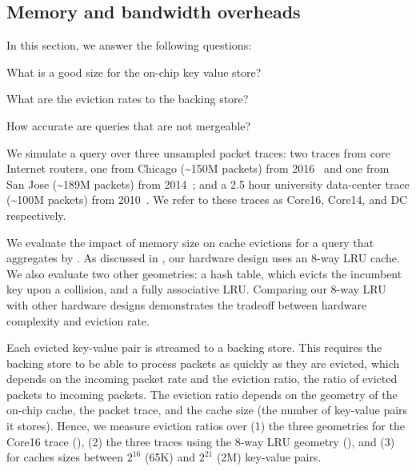 \subsection{Memory and bandwidth overheads}
\label{s:eval:traces}
\label{sec:eval:traces}

In this section, we answer the following questions:
\begin{CompactEnumerate}
\item What is a good size for the on-chip key value store?
\item What are the eviction rates to the backing store?
\item How accurate are queries that are not mergeable?
\end{CompactEnumerate}

  We simulate a \TheSystem query over three unsampled
packet traces: two traces from \tenglink core Internet routers, one from
Chicago (\textasciitilde{}150M packets) from 2016~\cite{caida2016}
and one from San Jose (\textasciitilde{}189M packets) from
2014~\cite{caida2014}; and a 2.5 hour university data-center trace
(\textasciitilde{}100M packets) from 2010~\cite{bensonDC}. We refer to
these traces as Core16, Core14, and DC respectively.

We evaluate the impact of memory size on cache evictions for a \TheSystem query
that aggregates by \txtftuple.  As discussed in , our
hardware design uses an 8-way LRU cache.  We also evaluate two other
geometries: a hash table, which evicts the incumbent key upon a collision, and
a fully associative LRU. Comparing our 8-way LRU with other hardware designs
demonstrates the tradeoff between hardware complexity and eviction rate.

Each evicted key-value pair is streamed to a backing store.  This requires the
backing store to be able to process packets as quickly as they are evicted,
which depends on the incoming packet rate and the eviction ratio, \ie the ratio
of evicted packets to incoming packets.  The eviction ratio depends on the
geometry of the on-chip cache, the packet trace, and the cache size (\ie the
number of key-value pairs it stores). Hence, we measure eviction ratios over
(1) the three geometries for the Core16 trace (), (2) the
three traces using the 8-way LRU geometry (), and (3) for
caches sizes between $2^{16}$ (65K) and $2^{21}$ (2M) key-value pairs.

